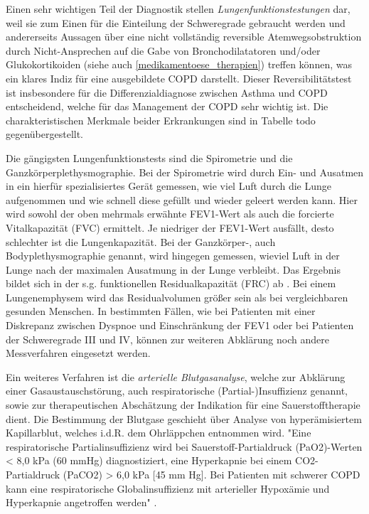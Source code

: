 Einen sehr wichtigen Teil der Diagnostik stellen \emph{Lungenfunktionstestungen} dar, weil sie zum Einen für die Einteilung der Schweregrade gebraucht werden und andererseits Aussagen über eine nicht vollständig reversible Atemwegsobstruktion durch Nicht-Ansprechen auf die Gabe von Bronchodilatatoren und/oder Glukokortikoiden (siehe auch \ref{medikamentoese_therapien}) treffen können, was ein klares Indiz für eine ausgebildete COPD darstellt. Dieser Reversibilitätstest ist insbesondere für die Differenzialdiagnose zwischen Asthma und COPD entscheidend, welche für das Management der COPD sehr wichtig ist. Die charakteristischen Merkmale beider Erkrankungen sind in Tabelle todo gegenübergestellt.

Die gängigsten Lungenfunktionstests sind die Spirometrie und die Ganzkörperplethysmographie. Bei der Spirometrie wird durch Ein- und Ausatmen in ein hierfür spezialisiertes Gerät gemessen, wie viel Luft durch die Lunge aufgenommen und wie schnell diese gefüllt und wieder geleert werden kann. Hier wird sowohl der oben mehrmals erwähnte FEV1-Wert als auch die forcierte Vitalkapazität (FVC) ermittelt. Je niedriger der FEV1-Wert ausfällt, desto schlechter ist die Lungenkapazität. Bei der Ganzkörper-, auch Bodyplethysmographie genannt, wird hingegen gemessen, wieviel Luft in der Lunge nach der maximalen Ausatmung in der Lunge verbleibt. Das Ergebnis bildet sich in der s.g. funktionellen Residualkapazität (FRC) ab \autocite[vgl.][e6f.]{vogelmeier2007}. Bei einem Lungenemphysem wird das Residualvolumen größer sein als bei vergleichbaren gesunden Menschen. In bestimmten Fällen, wie bei Patienten mit einer Diskrepanz zwischen Dyspnoe und Einschränkung der FEV1 oder bei Patienten der Schweregrade III und IV, können zur weiteren Abklärung noch andere Messverfahren eingesetzt werden.

Ein weiteres Verfahren ist die \emph{arterielle Blutgasanalyse}, welche zur Abklärung einer Gasaustauschstörung, auch respiratorische (Partial-)Insuffizienz genannt, sowie zur therapeutischen Abschätzung der Indikation für eine Sauerstofftherapie dient. Die Bestimmung der Blutgase geschieht über Analyse von hyperämisiertem Kapillarblut, welches i.d.R. dem Ohrläppchen entnommen wird. "Eine respiratorische Partialinsuffizienz wird bei Sauerstoff-Partialdruck (PaO2)-Werten < 8,0 kPa (60 mmHg) diagnostiziert, eine Hyperkapnie bei einem CO2-Partialdruck (PaCO2) > 6,0 kPa [45 mm Hg]. Bei Patienten mit schwerer COPD kann eine respiratorische Globalinsuffizienz mit arterieller Hypoxämie und Hyperkapnie angetroffen werden" \autocite[190]{welte2007}.

